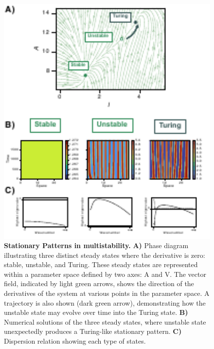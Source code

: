 \begin{figure}[H] %
    \centering
    \begin{adjustbox}{center}
        \includegraphics[width=1\textwidth]{chapters/Chapter 1/multistability1} %
    \end{adjustbox}
    \caption{\textbf{Stationary Patterns in multistability.} \textbf{A)} Phase diagram illustrating three distinct steady states where the derivative is zero: stable, unstable, and Turing. These steady states are represented within a parameter space defined by two axes: A and V. The vector field, indicated by light green arrows, shows the direction of the derivatives of the system at various points in the parameter space. A trajectory is also shown (dark green arrow), demonstrating how the unstable state may evolve over time into the Turing state. \textbf{B)} Numerical solutions of the three steady states, where unstable state unexpectedly produces a Turing-like stationary pattern. \textbf{C)} Dispersion relation showing each type of states.}
    \label{fig:multistability1} %
\end{figure}

